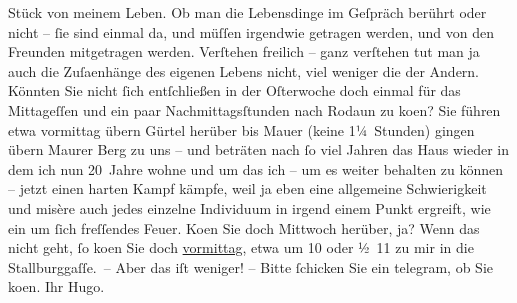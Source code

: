 \begin{ledgroupsized}[t]{13cm}
               Stück von meinem Leben. Ob man die Lebensdinge im Geſpräch berührt oder nicht – ſie
               sind einmal {\pb}da, und müſſen
               irgendwie getragen werden, und von den Freunden mitgetragen werden.\pend
           \pstart
           Verſtehen freilich – ganz verſtehen tut man ja auch die Zuſa{\geminationm}enhänge des eigenen Lebens nicht, viel weniger die der
               Andern.\pend
           \pstart
           Könnten Sie nicht ſich entſchließen in der Oſterwoche doch einmal für
               das Mittageſſen und ein paar Nachmittagsſtunden nach Rodaun zu ko{\geminationm}en? {\pb}Sie führen etwa vormittag übern
                  Gürtel herüber bis Mauer (keine 1¼ Stunden) gingen übern Maurer Berg zu uns – und beträten nach ſo viel Jahren das Haus wieder in dem ich nun
               20 Jahre wohne und um das ich – um es weiter behalten zu können – jetzt einen harten
               Kampf kämpfe, weil ja eben eine {\pb}allgemeine Schwierigkeit und misère auch jedes einzelne Individuum in irgend einem
               Punkt ergreift, wie ein um ſich freſſendes Feuer.\pend
           \pstart
           Ko{\geminationm}en Sie doch Mittwoch herüber, ja?\pend
           \pstart
           Wenn das nicht geht, ſo ko{\geminationm}en Sie doch \label{K_L02364-1v}\label{K_L02364-1h}{ }\uline{vormittag}, etwa um 10 oder ½ 11 zu mir in die Stallburggaſſe. – Aber das iſt weniger! – Bitte
               ſchicken Sie ein telegram, ob Sie ko{\geminationm}en.\pend
           \pstart Ihr \spacefill\mbox{Hugo.}\pend{}
         
         \endnumbering{}\end{ledgroupsized}  \newcommand{\dateiname}{L02364}\newcommand{\titel}{Hugo Hofmannsthal an Arthur Schnitzler, [19. 3. 1921]}\newcommand{\editorInnen}{Martin Anton Müller und Gerd-Hermann Susen}
      